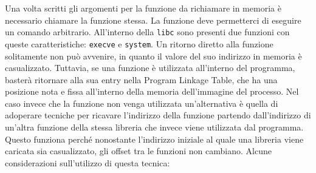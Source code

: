 Una volta scritti gli argomenti per la funzione da richiamare in
memoria è necessario chiamare la funzione stessa. La funzione deve
permetterci di eseguire un comando arbitrario. All'interno della
\lstinline{libc} sono presenti due funzioni con queste
caratteristiche: \lstinline{execve} e \lstinline{system}. Un ritorno
diretto alla funzione solitamente non può avvenire, in quanto il
valore del suo indirizzo in memoria è casualizzato. Tuttavia, se una
funzione è utilizzata all'interno del programma, basterà ritornare
alla sua entry nella Program Linkage Table, che ha una posizione nota
e fissa all'interno della memoria dell'immagine del processo. Nel caso
invece che la funzione non venga utilizzata un'alternativa è quella di
adoperare tecniche per ricavare l'indirizzo della funzione partendo
dall'indirizzo di un'altra funzione della stessa libreria che invece
viene utilizzata dal programma. Questo funziona perché nonostante
l'indirizzo iniziale al quale una libreria viene caricata sia
casualizzato, gli offset tra le funzioni non cambiano. Alcune
considerazioni sull'utilizzo di questa tecnica:

